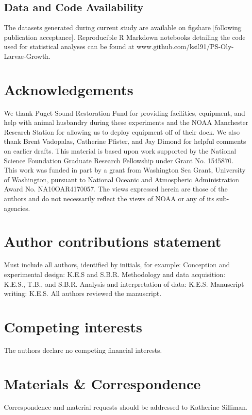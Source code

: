 \documentclass[fleqn,10pt]{wlscirep}
\begin{document}
\subsection*{Data and Code Availability}
The datasets generated during current study are available on figshare [following publication acceptance]. Reproducible R Markdown notebooks detailing the code used for statistical analyses can be found at www.github.com/ksil91/PS-Oly-Larvae-Growth.



\section*{Acknowledgements}

We thank Puget Sound Restoration Fund for providing facilities, equipment, and help with animal husbandry during these experiments and the NOAA Manchester Research Station for allowing us to deploy equipment off of their dock. We also thank Brent Vadopalas, Catherine Pfister, and Jay Dimond for helpful comments on earlier drafts. This material is based upon work supported by the National Science Foundation Graduate Research Fellowship under Grant No. 1545870. This work was funded in part by a grant from Washington Sea Grant, University of Washington, pursuant to National Oceanic and Atmospheric Administration Award No. NA10OAR4170057. The views expressed herein are those of the authors and do not necessarily reflect the views of NOAA or any of its sub-agencies.

\section*{Author contributions statement}

Must include all authors, identified by initials, for example:
Conception and experimental design: K.E.S and S.B.R. Methodology and data acquisition: K.E.S., T.B., and S.B.R. Analysis and interpretation of data: K.E.S. Manuscript writing: K.E.S. All authors reviewed the manuscript. 

\section*{Competing interests}
The authors declare no competing financial interests.

\section*{Materials \& Correspondence}
Correspondence and material requests should be addressed to Katherine Silliman.
\end{document}
